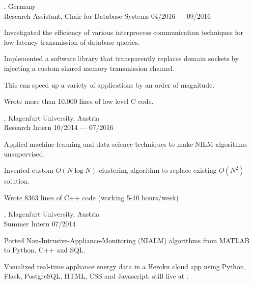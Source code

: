 \begin{entry}
	{, Germany}
	{\\Research Assistant, Chair for Database Systems}
	{04/2016 --- 09/2016}

  \item Investigated the efficiency of various interprocess communication techniques for low-latency transmission of database queries.
  \item Implemented a software library that transparently replaces domain sockets by injecting a custom shared memory transmission channel.
  \item This can speed up a variety of applications by an order of magnitude.
  \item Wrote more than 10,000 lines of low level C code.
\end{entry}

\begin{entry}
	{, Klagenfurt University, Austria}
	{\\Research Intern}
	{10/2014 --- 07/2016}

\item Applied machine-learning and data-science techniques to make NILM
  algorithms unsupervised.
	\item Invented custom $O(N \log N)$ clustering algorithm to replace existing $O(N^2)$ solution.
	\item Wrote 8363 lines of C++ code (working 5-10 hours/week)
\end{entry}

\begin{entry}
	{, Klagenfurt University, Austria}
	{\\Summer Intern}
	{07/2014}

	\item Ported Non-Intrusive-Appliance-Monitoring (NIALM) algorithms from MATLAB to Python, C++ and SQL.
	\item Visualized real-time appliance energy data in a Heroku cloud app using Python, Flask, PostgreSQL, HTML, CSS and Javascript; still live at .
\end{entry}

\vspace{-2mm}

